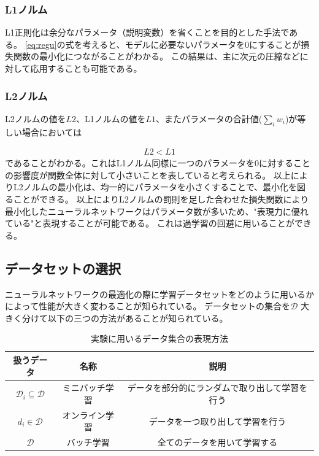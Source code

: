 \subsubsection{L1ノルム}
L1正則化は余分なパラメータ（説明変数）を省くことを目的とした手法である。
\ref{eq:regu}の式を考えると、モデルに必要ないパラメータを$ 0 $にすることが損失関数の最小化につながることがわかる。
この結果は、主に次元の圧縮などに対して応用することも可能である。

\subsubsection{L2ノルム}
L2ノルムの値を$ L2 $、L1ノルムの値を$ L1 $、またパラメータの合計値($ \sum_i w_i $)が等しい場合においては

\begin{eqnarray}
L2 < L1
\label{eq:norm uneq}
\end{eqnarray}
であることがわかる。これはL1ノルム同様に一つのパラメータを$ 0 $に対することの影響度が関数全体に対して小さいことを表していると考えられる。
以上によりL2ノルムの最小化は、均一的にパラメータを小さくすることで、最小化を図ることができる。
以上によりL2ノルムの罰則を足した合わせた損失関数により最小化したニューラルネットワークはパラメータ数が多いため、"表現力に優れている"と表現することが可能である。
これは過学習の回避に用いることができる。


\subsection{データセットの選択}
ニューラルネットワークの最適化の際に学習データセットをどのように用いるかによって性能が大きく変わることが知られている。
データセットの集合を$ \mathcal{D} $ 大きく分けて以下の三つの方法があることが知られている。

\begin{table}[htbp]
    \begin{center}
        \caption{実験に用いるデータ集合の表現方法}
        \vspace{2mm} 
        \begin{tabular}{|c|c|c|}
        \hline
        扱うデータ      & 名称 & 説明 \\
        \hline
        $ \mathcal{D}_i \subseteq \mathcal{D} $          & ミニバッチ学習  & データを部分的にランダムで取り出して学習を行う \\
        \hline
        $ d_i \in \mathcal{D} $                & オンライン学習 & データを一つ取り出して学習を行う  \\
        \hline
        $ \mathcal{D}  $      & バッチ学習 & 全てのデータを用いて学習する \\
        \hline
        \end{tabular}
    \end{center}
\end{table}

